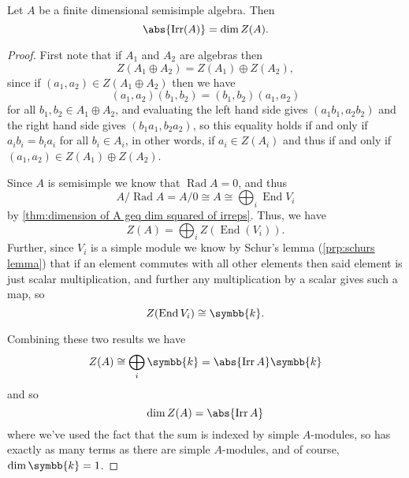 \documentclass[fleqn]{NotesClass}
\renewcommand{\field}{\symbb{k}}
\DeclareMathOperator{\End}{End}
\newcommand{\isomorphic}{\cong}
\DeclareMathOperator{\Rad}{Rad}
\DeclareMathOperator{\Irr}{Irr}
\begin{document}
    \begin{lma}{}{}
        Let \(A\) be a finite dimensional semisimple algebra.
        Then
        \begin{equation}
            \abs{\Irr(A)} = \dim Z(A).
        \end{equation}
        \begin{proof}
            First note that if \(A_1\) and \(A_2\) are algebras then
            \begin{equation}
                Z(A_1 \oplus A_2) = Z(A_1) \oplus Z(A_2),
            \end{equation}
            since if \((a_1, a_2) \in Z(A_1 \oplus A_2)\) then we have
            \begin{equation}
                (a_1, a_2)(b_1, b_2) = (b_1, b_2)(a_1, a_2)
            \end{equation}
            for all \(b_1, b_2 \in A_1 \oplus A_2\), and evaluating the left hand side gives \((a_1b_1, a_2b_2)\) and the right hand side gives \((b_1a_1, b_2a_2)\), so this equality holds if and only if \(a_ib_i = b_ia_i\) for all \(b_i \in A_i\), in other words, if \(a_i \in Z(A_i)\) and thus if and only if \((a_1, a_2) \in Z(A_1) \oplus Z(A_2)\).
            
            Since \(A\) is semisimple we know that \(\Rad A = 0\), and thus
            \begin{equation}
                A/\Rad A = A/0 \isomorphic A \isomorphic \bigoplus_i \End V_i
            \end{equation}
            by \cref{thm:dimension of A geq dim squared of irreps}.
            Thus, we have
            \begin{equation}
                Z(A) = \bigoplus_i Z(\End(V_i)).
            \end{equation}
            Further, since \(V_i\) is a simple module we know by Schur's lemma (\cref{prp:schurs lemma}) that if an element commutes with all other elements then said element is just scalar multiplication, and further any multiplication by a scalar gives such a map, so
            \begin{equation}
                Z(\End V_i) \isomorphic \field.
            \end{equation}
            
            Combining these two results we have
            \begin{equation}
                Z(A) \isomorphic \bigoplus_i \field = \abs{\Irr A} \field
            \end{equation}
            and so
            \begin{equation}
                \dim Z(A) = \abs{\Irr A}
            \end{equation}
            where we've used the fact that the sum is indexed by simple \(A\)-modules, so has exactly as many terms as there are simple \(A\)-modules, and of course, \(\dim \field = 1\).
        \end{proof}
    \end{lma}
    
\end{document}
